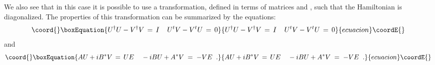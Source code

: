 \documentclass[a4paper,12pt]{article}
\begin{document}
We also see that in this case it is possible to use a transformation,
defined in terms of \coordHE{} matrices \coordHE{} and \coordHE{}, such that the Hamiltonian
is diagonalized. The properties of this transformation can be summarized by
the equations: 
\begin{equation}\coord{}\boxEquation{
U^\dagger U - V^\dagger V\,=\,I \;\;\;\; U^t V-V^t U\,=\,0 
}{
U^\dagger U - V^\dagger V\,=\,I \;\;\;\; U^t V-V^t U\,=\,0 
}{ecuacion}\coordE{}\end{equation}
and 
\begin{equation}\coord{}\boxEquation{
A U + i B^* V \,=\, U E \;\;\;\; -i B U + A^* V \;=\;- V E \;\;.
}{
A U + i B^* V \,=\, U E \;\;\;\; -i B U + A^* V \;=\;- V E \;\;.
}{ecuacion}\coordE{}\end{equation}
\end{document}
